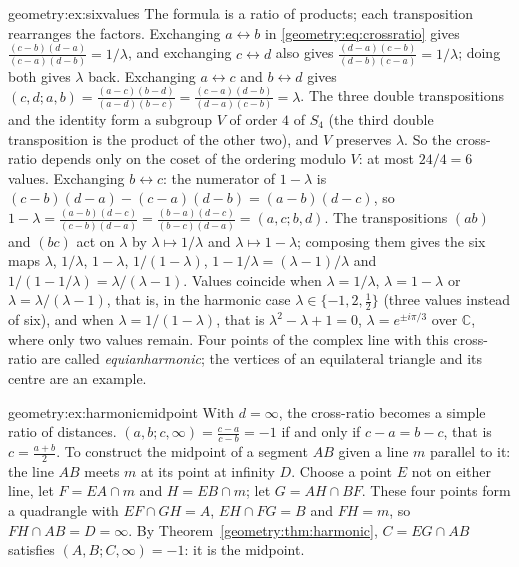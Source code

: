 \begin{solution}{geometry:ex:sixvalues}
\idea The formula is a ratio of products; each transposition rearranges the factors.
\writeup Exchanging $a\leftrightarrow b$ in \eqref{geometry:eq:crossratio} gives $\frac{(c-b)(d-a)}{(c-a)(d-b)}=1/\lambda$, and exchanging $c\leftrightarrow d$
also gives $\frac{(d-a)(c-b)}{(d-b)(c-a)}=1/\lambda$; doing both gives $\lambda$ back. Exchanging $a\leftrightarrow c$ and $b\leftrightarrow d$ gives
$(c,d;a,b)=\frac{(a-c)(b-d)}{(a-d)(b-c)}=\frac{(c-a)(d-b)}{(d-a)(c-b)}=\lambda$. The three double transpositions and the identity form a subgroup $V$ of
order $4$ of $S_4$ (the third double transposition is the product of the other two), and $V$ preserves $\lambda$. So the cross-ratio depends
only on the coset of the ordering modulo $V$: at most $24/4=6$ values.
Exchanging $b\leftrightarrow c$: the numerator of $1-\lambda$ is $(c-b)(d-a)-(c-a)(d-b)=(a-b)(d-c)$, so
$1-\lambda=\frac{(a-b)(d-c)}{(c-b)(d-a)}=\frac{(b-a)(d-c)}{(b-c)(d-a)}=(a,c;b,d)$. The transpositions $(ab)$ and $(bc)$ act on $\lambda$ by
$\lambda\mapsto1/\lambda$ and $\lambda\mapsto1-\lambda$; composing them gives the six maps $\lambda$, $1/\lambda$, $1-\lambda$, $1/(1-\lambda)$,
$1-1/\lambda=(\lambda-1)/\lambda$ and $1/(1-1/\lambda)=\lambda/(\lambda-1)$. Values coincide when $\lambda=1/\lambda$, $\lambda=1-\lambda$ or
$\lambda=\lambda/(\lambda-1)$, that is, in the harmonic case $\lambda\in\{-1,2,\frac12\}$ (three values instead of six), and when $\lambda=1/(1-\lambda)$,
that is $\lambda^2-\lambda+1=0$, $\lambda=e^{\pm i\pi/3}$ over $\mathbb C$, where only two values remain. Four points of the complex line with this
cross-ratio are called \emph{equianharmonic}; the vertices of an equilateral triangle and its centre are an example.
\end{solution}

\begin{solution}{geometry:ex:harmonicmidpoint}
\idea With $d=\infty$, the cross-ratio becomes a simple ratio of distances.
\writeup $(a,b;c,\infty)=\frac{c-a}{c-b}=-1$ if and only if $c-a=b-c$, that is $c=\frac{a+b}2$. To construct the midpoint of a segment $AB$
given a line $m$ parallel to it: the line $AB$ meets $m$ at its point at infinity $D$. Choose a point $E$ not on either line, let $F=EA\cap m$ and
$H=EB\cap m$; let $G=AH\cap BF$. These four points form a quadrangle with $EF\cap GH=A$, $EH\cap FG=B$ and $FH=m$, so $FH\cap AB=D=\infty$. By
Theorem~\ref{geometry:thm:harmonic}, $C=EG\cap AB$ satisfies $(A,B;C,\infty)=-1$: it is the midpoint.
\end{solution}

